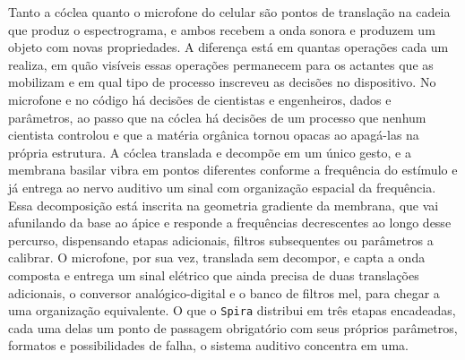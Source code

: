 Tanto a cóclea quanto o microfone do celular são pontos de translação na cadeia que produz o espectrograma, e ambos recebem a onda sonora e produzem um objeto com novas propriedades. A diferença está em quantas operações cada um realiza, em quão visíveis essas operações permanecem para os actantes que as mobilizam e em qual tipo de processo inscreveu as decisões no dispositivo. No microfone e no código há decisões de cientistas e engenheiros, dados e parâmetros, ao passo que na cóclea há decisões de um processo que nenhum cientista controlou e que a matéria orgânica tornou opacas ao apagá-las na própria estrutura. A cóclea translada e decompõe em um único gesto, e a membrana basilar vibra em pontos diferentes conforme a frequência do estímulo e já entrega ao nervo auditivo um sinal com organização espacial da frequência. Essa decomposição está inscrita na geometria gradiente da membrana, que vai afunilando da base ao ápice e responde a frequências decrescentes ao longo desse percurso, dispensando etapas adicionais, filtros subsequentes ou parâmetros a calibrar. O microfone, por sua vez, translada sem decompor, e capta a onda composta e entrega um sinal elétrico que ainda precisa de duas translações adicionais, o conversor analógico-digital e o banco de filtros mel, para chegar a uma organização equivalente. O que o \texttt{Spira} distribui em três etapas encadeadas, cada uma delas um ponto de passagem obrigatório com seus próprios parâmetros, formatos e possibilidades de falha, o sistema auditivo concentra em uma.

